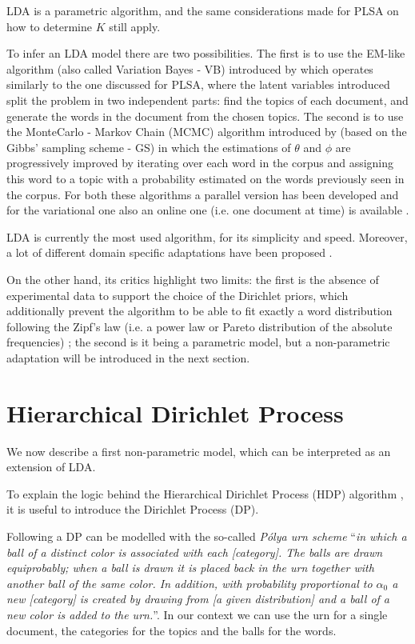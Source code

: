 \documentclass[11pt, a4paper, oneside, openright]{book}
\begin{document}
LDA is a parametric algorithm, and the same considerations made for PLSA on how to determine $K$ still apply.

To infer an LDA model there are two possibilities. 
The first is to use the EM-like algorithm (also called Variation Bayes - VB) introduced by \textcite{blei2003} which operates similarly to the one discussed for PLSA, where the latent variables introduced split the problem in two independent parts: find the topics of each document, and generate the words in the document from the chosen topics.
The second is to use the MonteCarlo - Markov Chain (MCMC) algorithm introduced by \textcite{griffiths2004} (based on the Gibbs' sampling scheme - GS) in which the estimations of $\theta$ and $\phi$ are progressively improved by iterating over each word in the corpus and assigning this word to a topic with a probability estimated on the words previously seen in the corpus. 
For both these algorithms a parallel version has been developed and for the variational one also an online one (i.e. one document at time) is available \parencite{newman2009,hoffman2010}.

LDA is currently the most used algorithm, for its simplicity and speed. Moreover, a lot of different domain specific adaptations have been proposed \parencite{jelodar2019}.

On the other hand, its critics highlight two limits: the first is the absence of experimental data to support the choice of the Dirichlet priors, which additionally prevent the algorithm to be able to fit exactly a word distribution following the Zipf's law \parencite{zipf1965} (i.e. a power law or Pareto distribution of the absolute frequencies) \parencite{gerlach2018}; the second is it being a parametric model, but a non-parametric adaptation will be introduced in the next section.

\section{Hierarchical Dirichlet Process}
We now describe a first non-parametric model, which can be interpreted as an extension of LDA.

To explain the logic behind the Hierarchical Dirichlet Process (HDP) algorithm \parencite{teh2005}, it is useful to introduce the Dirichlet Process (DP).

Following \textcite{teh2005} a DP can be modelled with the so-called \textit{P\'{o}lya urn scheme} ``\textit{in which a ball of a
distinct color is associated with each [category]. The balls are drawn equiprobably; when a ball is drawn it is placed back in the urn together with another ball of the same color. In addition, with probability proportional to $\alpha_0$ a new [category] is created by drawing from [a given distribution] and a ball of a new color is added to the urn.}''. In our context we can use the urn for a single document, the categories for the topics and the balls for the words.
\end{document}
